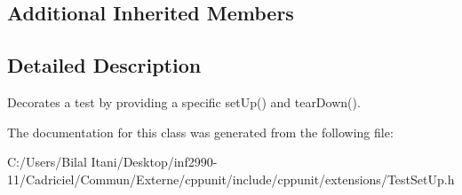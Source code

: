 \subsection*{Additional Inherited Members}


\subsection{Detailed Description}
Decorates a test by providing a specific set\+Up() and tear\+Down(). 

The documentation for this class was generated from the following file\+:\begin{DoxyCompactItemize}
\item 
C\+:/\+Users/\+Bilal Itani/\+Desktop/inf2990-\/11/\+Cadriciel/\+Commun/\+Externe/cppunit/include/cppunit/extensions/Test\+Set\+Up.\+h\end{DoxyCompactItemize}
